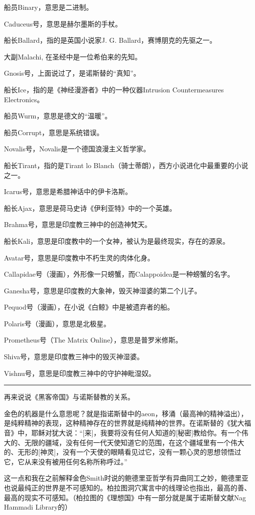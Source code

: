 \documentclass[UTF8]{ctexart}
\newcommand{\myparsep}{\noindent \rule[0.5ex]{\linewidth}{1pt}}
\begin{document}
船员Binary，意思是二进制。

Caduceus号，意思是赫尔墨斯的手杖。

船长Ballard，指的是英国小说家J. G. Ballard，赛博朋克的先驱之一。

大副Malachi, 在圣经中是一位希伯来的先知。

Gnosis号，上面说过了，是诺斯替的“真知”。

船长Ice，指的是《神经漫游者》中的一种仪器Intrusion Countermeasures Electronics。

船员Wurm，意思是德文的“温暖”。

船员Corrupt，意思是系统错误。

Novalis号，Novalis是一个德国浪漫主义哲学家。

船长Tirant，指的是Tirant lo Blanch（骑士蒂朗），西方小说进化中最重要的小说之一。

Icarus号，意思是希腊神话中的伊卡洛斯。

船长Ajax，意思是荷马史诗《伊利亚特》中的一个英雄。

Brahma号，意思是印度教三神中的创造神梵天。

船长Kali，意思是印度教中的一个女神，被认为是最终现实，存在的源泉。

Avatar号，意思是印度教中不朽生灵的肉体化身。

Callapidae号（漫画），外形像一只螃蟹，而Calappoidea是一种螃蟹的名字。

Ganesha号，意思是印度教的大象神，毁灭神湿婆的第二个儿子。

Pequod号（漫画），在小说《白鲸》中是被遗弃者的船。

Polaris号（漫画），意思是北极星。

Prometheus号（The Matrix Online），意思是普罗米修斯。

Shiva号，意思是印度教三神中的毁灭神湿婆。

Vishnu号，意思是印度教三神中的守护神毗湿奴。

\myparsep

再来说说《黑客帝国》与诺斯替教的关系。

金色的机器是什么意思呢？就是指诺斯替中的aeon，移涌（最高神的精神溢出），是纯粹精神的表现，这种精神存在的世界就是纯精神的世界。在诺斯替的《犹大福音》中，耶稣对犹大说：“[来]，我要将没有任何人知道的[秘密]教给你。有一个伟大的、无限的疆域，没有任何一代天使知道它的范围，在这个疆域里有一个伟大的、无形的[神灵]，没有一个天使的眼睛看见过它，没有一颗心灵的思想领悟过它，它从来没有被用任何名称所称呼过。”

这一点和我在之前解释金色Smith时说的鲍德里亚哲学有异曲同工之妙，鲍德里亚也说最纯正的世界是不可感知的。柏拉图洞穴寓言中的线理论也指出，最高的善、最高的现实不可感知。（柏拉图的《理想国》中有一部分就是属于诺斯替文献Nag Hammadi Library的）
\end{document}
